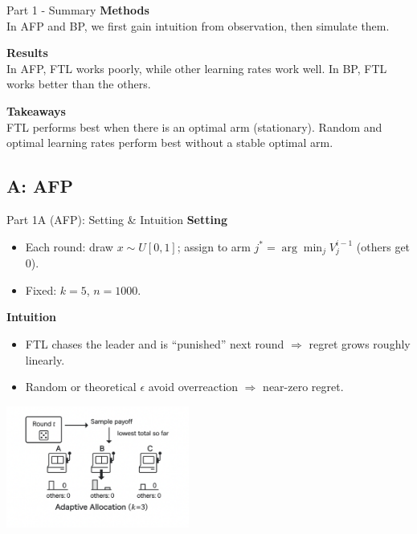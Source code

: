 \documentclass{beamer}
\begin{document}
\begin{frame}{Part 1 - Summary}
\textbf{Methods}\\
In AFP and BP, we first gain intuition from observation, then simulate them.

\vspace{0.7em}
\textbf{Results}\\
In AFP, FTL works poorly, while other learning rates work well. In BP, FTL works better than the others.

\vspace{0.7em}
\textbf{Takeaways}\\
FTL performs best when there is an optimal arm (stationary). Random and optimal learning rates perform best without a stable optimal arm.
\end{frame}

\subsection{A: AFP}

\begin{frame}{Part 1A (AFP): Setting \& Intuition}
\textbf{Setting}
\begin{itemize}
  \item Each round: draw $x\sim U[0,1]$; assign to arm $j^*=\arg\min_j V_{j}^{i-1}$ (others get $0$).
  \item Fixed: $k=5$, $n=1000$.
\end{itemize}
\textbf{Intuition}
\begin{itemize}
  \item FTL chases the leader and is “punished” next round $\Rightarrow$ regret grows roughly linearly.
  \item Random or theoretical $\epsilon$ avoid overreaction $\Rightarrow$ near-zero regret.
\end{itemize}
\centering
\includegraphics[width=0.45\textwidth]{../figures/Image_A.png}
\end{frame}
\end{document}
